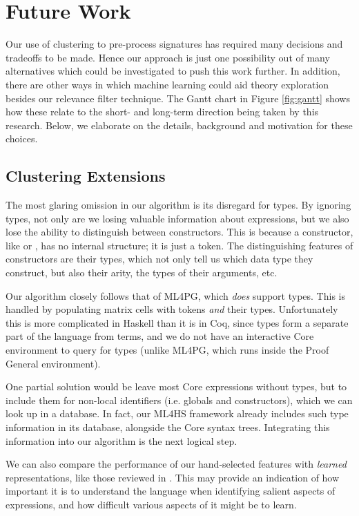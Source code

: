 \section{Future Work}
\label{sec:future}

Our use of clustering to pre-process \qspec{} signatures has required many decisions and tradeoffs to be made. Hence our approach is just one possibility out of many alternatives which could be investigated to push this work further. In addition, there are other ways in which machine learning could aid theory exploration besides our relevance filter technique. The Gantt chart in Figure \ref{fig:gantt} shows how these relate to the short- and long-term direction being taken by this research. Below, we elaborate on the details, background and motivation for these choices.

\subsection{Clustering Extensions}
\label{sec:preprocessing}

The most glaring omission in our algorithm is its disregard for types. By ignoring types, not only are we losing valuable information about expressions, but we also lose the ability to distinguish between constructors. This is because a constructor, like  or , has no internal structure; it is just a token. The distinguishing features of constructors are their types, which not only tell us which data type they construct, but also their arity, the types of their arguments, etc.

Our algorithm closely follows that of ML4PG, which \emph{does} support types. This is handled by populating matrix cells with tokens \emph{and} their types. Unfortunately this is more complicated in Haskell than it is in Coq, since types form a separate part of the language from terms, and we do not have an interactive Core environment to query for types (unlike ML4PG, which runs inside the Proof General environment).

One partial solution would be leave most Core expressions without types, but to include them for non-local identifiers (i.e. globals and constructors), which we can look up in a database. In fact, our ML4HS framework already includes such type information in its database, alongside the Core syntax trees. Integrating this information into our algorithm is the next logical step.

We can also compare the performance of our hand-selected features with \emph{learned} representations, like those reviewed in \cite{bengio2013representation}. This may provide an indication of how important it is to understand the language when identifying salient aspects of expressions, and how difficult various aspects of it might be to learn.

